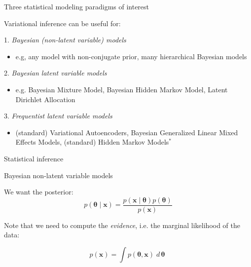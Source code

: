 \documentclass[10pt]{beamer}
\newcommand{\ds}{\displaystyle}
\newcommand{\df}{\displaystyle\frac}
\newcommand{\+}[1]{\ensuremath{{\boldsymbol #1}}} %
\newcommand{\cond}{\; | \;}
\newcommand{\wrt}[1]{\; d \,{#1} \;}
\begin{document}
\begin{frame}{Three statistical modeling paradigms of interest}

Variational inference can be useful for:

\vfill

1. \alert{\emph {Bayesian (non-latent variable) models}}
	\begin{itemize}
	\item e.g, any model with non-conjugate prior, many hierarchical Bayesian models
	\end{itemize}
2. \alert{\emph{Bayesian latent variable models}}
	\begin{itemize}
	\item e.g. Bayesian Mixture Model, Bayesian Hidden Markov Model, Latent Dirichlet Allocation
	\end{itemize}
3. \alert{\emph{Frequentist latent variable models}}
	\begin{itemize}
	\item  (standard) Variational Autoencoders, Bayesian Generalized Linear Mixed Effects Models, (standard) Hidden Markov Models$^*$%
	\end{itemize}
\end{frame}

		


\begin{frame}{Statistical inference}

\begin{block}{Bayesian non-latent variable models}

We want the posterior:
\[ p(\+\theta \cond \+x) =  \df{p(\+x \cond \+\theta ) p(\+\theta )}{p(\+x)} \]

Note that we need to compute the \textit{evidence}, i.e. the marginal likelihood of the data: 

	\begin{equation}
	 p(\+x) = \ds\int p(\+\theta,\+x) \wrt{\+\theta}
	 \end{equation}
	 
\end{block} 

\end{frame}
\end{document}

